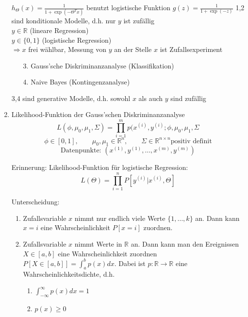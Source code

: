 \begin{enumerate}[(1)]
$h_\Theta(x) = \frac{1}{1+\exp(-\Theta^T x)}$ benutzt logistische Funktion $g(z) = \frac{1}{1+\exp(-z)}$
1,2 sind konditionale Modelle, d.h. nur $y$ ist zufällig\\
$y \in \mathbb{R}$ (lineare Regression)\\
$y \in \{0,1\}$ (logistische Regression)\\
$\Rightarrow x$ frei wählbar, Messung von $y$ an der Stelle $x$ ist Zufallsexperiment

\begin{enumerate}
\item[3.] Gauss'sche Diskriminanzanalyse (Klassifikation)
\item[4.] Naive Bayes (Kontingenzanalyse)
\end{enumerate}

3,4 sind generative Modelle, d.h. sowohl $x$ als auch $y$ sind zufällig
\item Likelihood-Funktion der Gauss'schen Diskriminanzanalyse
\[L(\phi,\mu_0, \mu_1, \Sigma) = \prod^m_{i=1} p(x^{(i)},y^{(i)};\phi,\mu_0, \mu_1, \Sigma\]
\[\phi \in [0,1], \quad\quad \mu_0, \mu_1 \in \mathbb{R}^n, \quad\quad \Sigma \in \mathbb{R}^{n \times n} \text{positiv definit}\]
\[\text{Datenpunkte: } (x^{(1)},y^{(1)}, \dots , x^{(m)},y^{(m)})\]

\begin{framed}
Erinnerung: Likelihood-Funktion für logistische Regression:
\[L(\Theta) = \prod^n_{i=1} P[y^{(i)} | x^{(i)}, \Theta]\]
\end{framed}

\begin{framed}
Unterscheidung:
\begin{enumerate}[1.]
\item Zufallsvariable $x$ nimmt nur endlich viele Werte $\{1, \dots , k\}$ an. Dann kann $x = i$ eine Wahrscheinlichkeit $P[x = i]$ zuordnen.
\item Zufallsvariable $x$ nimmt Werte in $\mathbb{R}$ an. Dann kann man den Ereignissen $X \in [a,b]$ eine Wahrscheinlichkeit zuordnen $P[X \in [a,b]] = \int^b_a p(x) dx$. Dabei ist $p:\mathbb{R} \rightarrow \mathbb{R}$ eine Wahrscheinlichkeitsdichte, d.h.

\begin{enumerate}[(1.)]
\item $\int^\infty_{- \infty} p(x) dx = 1$
\item $p(x) \geq 0$
\end{enumerate}
\end{enumerate}
\end{framed}


\end{enumerate}
